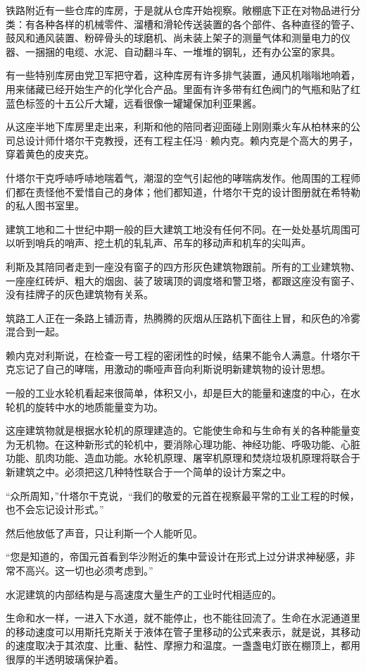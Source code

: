 铁路附近有一些仓库的库房，于是就从仓库开始视察。敞棚底下正在对物品进行分类：有各种各样的机械零件、溜槽和滑轮传送装置的各个部件、各种直径的管子、鼓风和通风装置、粉碎骨头的球磨机、尚未装上架子的测量气体和测量电力的仪器、一捆捆的电缆、水泥、自动翻斗车、一堆堆的钢轧，还有办公室的家具。

有一些特别库房由党卫军把守着，这种库房有许多排气装置，通风机嗡嗡地响着，用来储藏已经开始生产的化学化合产品。里面有许多带有红色阀门的气瓶和贴了红蓝色标签的十五公斤大罐，远看很像一罐罐保加利亚果酱。

从这座半地下库房里走出来，利斯和他的陪同者迎面碰上刚刚乘火车从柏林来的公司总设计师什塔尔干克教授，还有工程主任冯·赖内克。赖内克是个高大的男子，穿着黄色的皮夹克。

什塔尔干克呼哧呼哧地喘着气，潮湿的空气引起他的哮喘病发作。他周围的工程师们都在责怪他不爱惜自己的身体；他们都知道，什塔尔干克的设计图册就在希特勒的私人图书室里。

建筑工地和二十世纪中期一般的巨大建筑工地没有任何不同。在一处处基坑周围可以听到哨兵的哨声、挖土机的轧轧声、吊车的移动声和机车的尖叫声。

利斯及其陪同者走到一座没有窗子的四方形灰色建筑物跟前。所有的工业建筑物、一座座红砖炉、粗大的烟囱、装了玻璃顶的调度塔和警卫塔，都跟这座没有窗子、没有挂牌子的灰色建筑物有关系。

筑路工人正在一条路上铺沥青，热腾腾的灰烟从压路机下面往上冒，和灰色的冷雾混合到一起。

赖内克对利斯说，在检查一号工程的密闭性的时候，结果不能令人满意。什塔尔干克忘记了自己的哮喘，用激动的嘶哑声音向利斯说明新建筑物的设计思想。

一般的工业水轮机看起来很简单，体积又小，却是巨大的能量和速度的中心，在水轮机的旋转中水的地质能量变为功。

这座建筑物就是根据水轮机的原理建造的。它能使生命和与生命有关的各种能量变为无机物。在这种新形式的轮机中，要消除心理功能、神经功能、呼吸功能、心脏功能、肌肉功能、造血功能。水轮机原理、屠宰机原理和焚烧垃圾机原理将联合于新建筑之中。必须把这几种特性联合于一个简单的设计方案之中。

“众所周知，”什塔尔干克说，“我们的敬爱的元首在视察最平常的工业工程的时候，也不会忘记设计形式。”

然后他放低了声音，只让利斯一个人能听见。

“您是知道的，帝国元首看到华沙附近的集中营设计在形式上过分讲求神秘感，非常不高兴。这一切也必须考虑到。”

水泥建筑的内部结构是与高速度大量生产的工业时代相适应的。

生命和水一样，一进入下水道，就不能停止，也不能往回流了。生命在水泥通道里的移动速度可以用斯托克斯关于液体在管子里移动的公式来表示，就是说，其移动的速度取决于其浓度、比重、黏性、摩擦力和温度。一盏盏电灯嵌在棚顶上，都用很厚的半透明玻璃保护着。


